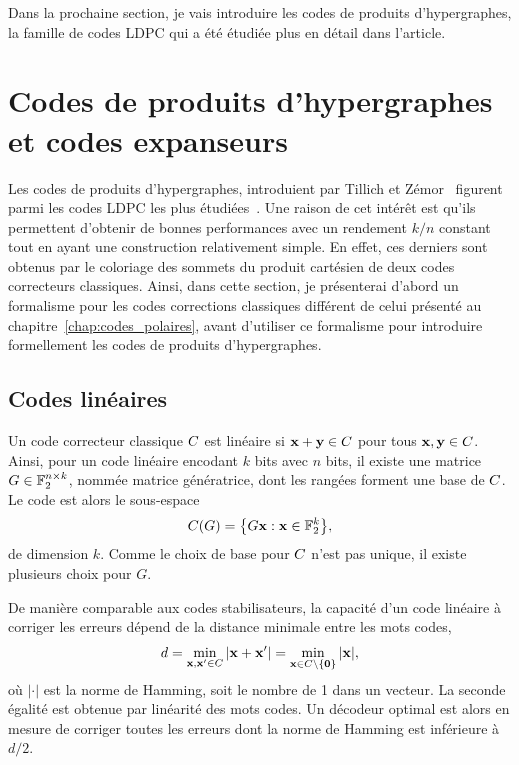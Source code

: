Dans la prochaine section,
je vais introduire les codes de produits d'hypergraphes, 
la famille de codes LDPC qui a été étudiée plus en détail dans l'article.

\section{Codes de produits d'hypergraphes et codes expanseurs}

Les codes de produits d'hypergraphes,
introduient par Tillich et Zémor~\cite{tillich_quantum_2014} figurent parmi les codes LDPC 
les plus étudiées~\cite{grospellier_combining_2020, grospellier_numerical_2018, leverrier_quantum_2015, kovalev_improved_2012, kovalev_numerical_2018}.
Une raison de cet intérêt est qu'ils permettent d'obtenir de bonnes performances 
avec un rendement $k/n$ constant tout en ayant une construction relativement simple.
En effet,
ces derniers sont obtenus par le coloriage des sommets du produit cartésien de
deux codes correcteurs classiques.
Ainsi,
dans cette section,
je présenterai d'abord un formalisme pour les codes corrections classiques
différent de celui présenté au chapitre~\ref{chap:codes_polaires},
avant d'utiliser ce formalisme pour introduire formellement les codes
de produits d'hypergraphes.

\subsection{Codes linéaires}

Un code correcteur classique $C$ est linéaire si $\vb x + \vb y \in C$ 
pour tous $\vb x, \vb y \in C$.
Ainsi,
pour un code linéaire encodant $k$ bits avec $n$ bits,
il existe une matrice $G \in \mathbb{F}_{2}^{n \times k}$,
nommée matrice génératrice,
dont les rangées forment une base de $C$.
Le code est alors le sous-espace
\begin{align}
	C(G) = \qty{
		G \vb x : \vb x \in \mathbb{F}_{2}^k
	},
\end{align}
de dimension $k$.
Comme le choix de base pour $C$ n'est pas unique,
il existe plusieurs choix pour $G$.

De manière comparable aux codes stabilisateurs,
la capacité d'un code linéaire à corriger les erreurs dépend de la distance minimale entre 
les mots codes,
\begin{align}
	d = \min_{\vb x, \vb x' \in C} | \vb x + \vb x'| = \min_{\vb x \in C \setminus \qty{\vb 0}} |\vb x|,
\end{align}
où $|\cdot|$ est la norme de Hamming, soit le nombre de 1 dans un vecteur.
La seconde égalité est obtenue par linéarité des mots codes.
Un décodeur optimal est alors en mesure de corriger toutes les erreurs dont la norme de Hamming
est inférieure à $d/2$.

